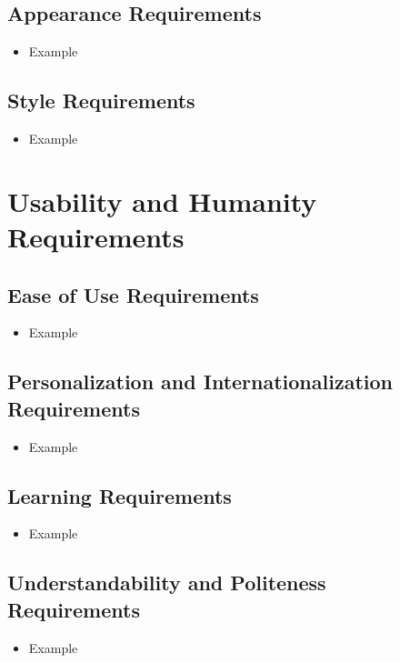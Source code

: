 \documentclass[12pt]{article}
\begin{document}
  \subsection{Appearance Requirements}
    \begin{itemize}
      \item Example
    \end{itemize}

  \subsection{Style Requirements}
    \begin{itemize}
      \item Example
    \end{itemize}

\section{Usability and Humanity Requirements}
  \subsection{Ease of Use Requirements}
    \begin{itemize}
      \item Example
    \end{itemize}

  \subsection{Personalization and Internationalization Requirements}
    \begin{itemize}
      \item Example
    \end{itemize}

  \subsection{Learning Requirements}
    \begin{itemize}
      \item Example
    \end{itemize}

  \subsection{Understandability and Politeness Requirements}
    \begin{itemize}
      \item Example
    \end{itemize}
\end{document}
